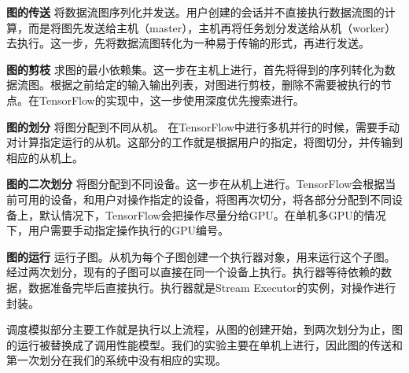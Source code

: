     {\bfseries 图的传送} 将数据流图序列化并发送。用户创建的会话并不直接执行数据流图的计算，而是将图先发送给主机（master），主机再将任务划分发送给从机（worker）去执行。这一步，先将数据流图转化为一种易于传输的形式，再进行发送。
    
    {\bfseries 图的剪枝} 求图的最小依赖集。这一步在主机上进行，首先将得到的序列转化为数据流图。根据之前给定的输入输出列表，对图进行剪枝，删除不需要被执行的节点。在TensorFlow的实现中，这一步使用深度优先搜索进行。

    {\bfseries 图的划分} 将图分配到不同从机。 在TensorFlow中进行多机并行的时候，需要手动对计算指定运行的从机。这部分的工作就是根据用户的指定，将图切分，并传输到相应的从机上。

    {\bfseries 图的二次划分} 将图分配到不同设备。这一步在从机上进行。TensorFlow会根据当前可用的设备，和用户对操作指定的设备，将图再次切分，将各部分分配到不同设备上，默认情况下，TensorFlow会把操作尽量分给GPU。在单机多GPU的情况下，用户需要手动指定操作执行的GPU编号。
    
    {\bfseries 图的运行} 运行子图。从机为每个子图创建一个执行器对象，用来运行这个子图。经过两次划分，现有的子图可以直接在同一个设备上执行。执行器等待依赖的数据，数据准备完毕后直接执行。执行器就是Stream Executor的实例，对操作进行封装。
    
    调度模拟部分主要工作就是执行以上流程，从图的创建开始，到两次划分为止，图的运行被替换成了调用性能模型。我们的实验主要在单机上进行，因此图的传送和第一次划分在我们的系统中没有相应的实现。
